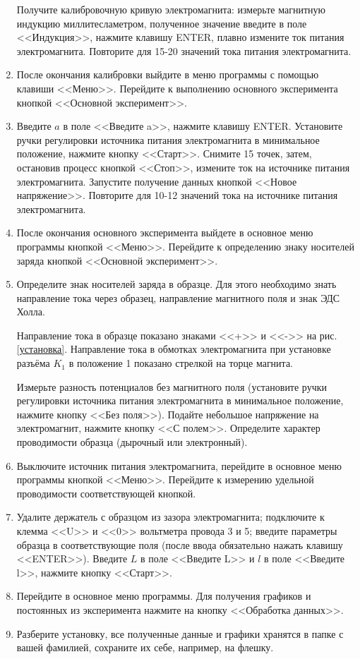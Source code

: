 \documentclass[a4paper,12pt]{article} %
\begin{document}
\begin{enumerate}
   Получите калибровочную кривую электромагнита: измерьте магнитную индукцию миллитесламетром, полученное значение введите в поле  <<Индукция>>, нажмите клавишу ENTER, плавно измените ток питания электромагнита. Повторите для 15-20 значений тока питания электромагнита.
  \item После окончания калибровки выйдите в меню программы с помощью клавиши  <<Меню>>. Перейдите к выполнению основного эксперимента кнопкой <<Основной эксперимент>>.
  \item Введите $a$ в поле <<Введите a>>, нажмите клавишу ENTER. Установите ручки регулировки источника питания электромагнита в минимальное положение, нажмите кнопку <<Старт>>. Снимите 15 точек, затем, остановив процесс кнопкой  <<Стоп>>, измените ток на источнике питания электромагнита. Запустите получение данных кнопкой  <<Новое напряжение>>. Повторите для 10-12 значений тока на источнике питания электромагнита.
  \item После окончания основного эксперимента выйдете в основное меню программы кнопкой  <<Меню>>. Перейдите к определению знаку носителей заряда кнопкой <<Основной эксперимент>>.
  \item Определите знак носителей заряда в образце. Для этого необходимо
знать направление тока через образец, направление магнитного поля
и знак ЭДС Холла.

Направление тока в образце показано знаками  <<+>> и  <<->> на рис. \ref{установка}.
Направление тока в обмотках электромагнита при установке разъёма $K_1$ в положение 1 показано стрелкой на торце магнита. 

Измерьте разность потенциалов без магнитного поля (установите ручки регулировки источника питания электромагнита в минимальное положение, нажмите кнопку  <<Без поля>>). Подайте небольшое напряжение на электромагнит, нажмите кнопку  <<С полем>>. Определите характер проводимости образца (дырочный или электронный). 

\item Выключите источник питания электромагнита, перейдите в основное меню программы кнопкой  <<Меню>>. Перейдите к измерению удельной проводимости соответствующей кнопкой.
\item Удалите держатель с образцом из зазора электромагнита; подключите к клемма  <<U>> и  <<0>> вольтметра провода 3 и 5; введите параметры образца в соответствующие поля (после ввода обязательно нажать клавишу  <<ENTER>>). Введите $L$  в поле <<Введите L>> и $l$ в поле <<Введите l>>, нажмите кнопку  <<Старт>>.
\item Перейдите в основное меню программы. Для получения графиков и постоянных из эксперимента нажмите на кнопку  <<Обработка данных>>. 
\item Разберите установку, все полученные данные и графики хранятся в папке с вашей фамилией, сохраните их себе, например, на флешку.
  
\end{enumerate}
\end{document}
